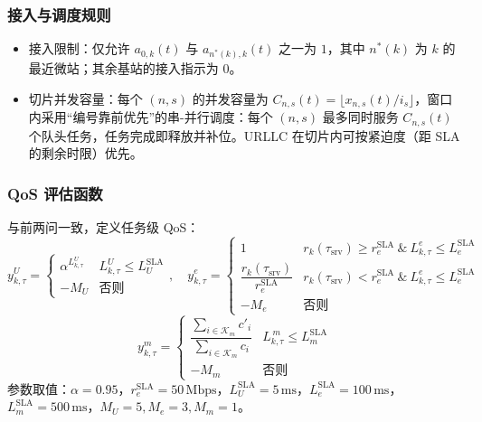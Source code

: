 \subsubsection{接入与调度规则}

\begin{itemize}
  \item 接入限制：仅允许 $a_{0,k}(t)$ 与 $a_{n^*(k),k}(t)$ 之一为 $1$，其中 $n^*(k)$ 为 $k$ 的最近微站；其余基站的接入指示为 $0$。
  \item 切片并发容量：每个 $(n,s)$ 的并发容量为 $C_{n,s}(t)=\big\lfloor x_{n,s}(t)/i_s\big\rfloor$，窗口内采用“编号靠前优先”的串-并行调度：每个 $(n,s)$ 最多同时服务 $C_{n,s}(t)$ 个队头任务，任务完成即释放并补位。URLLC 在切片内可按紧迫度（距 SLA 的剩余时限）优先。
\end{itemize}

\subsubsection{QoS 评估函数}

与前两问一致，定义任务级 QoS：
\begin{equation}
 y^{U}_{k,\tau}=\begin{cases}
 \alpha^{L^{U}_{k,\tau}} & L^{U}_{k,\tau}\le L^{\text{SLA}}_{U}\\
 -M_U & \text{否则}
 \end{cases},\quad
 y^{e}_{k,\tau}=\begin{cases}
 1 & r_{k}(\tau_\text{srv})\ge r^{\text{SLA}}_{e}\ \&\ L^{e}_{k,\tau}\le L^{\text{SLA}}_{e}\\
 \dfrac{r_{k}(\tau_\text{srv})}{r^{\text{SLA}}_{e}} & r_{k}(\tau_\text{srv})< r^{\text{SLA}}_{e}\ \&\ L^{e}_{k,\tau}\le L^{\text{SLA}}_{e}\\
 -M_e & \text{否则}
 \end{cases}
\end{equation}
\begin{equation}
 y^{m}_{k,\tau}=\begin{cases}
 \dfrac{\sum\limits_{i\in\mathcal{K}_m}c'_i}{\sum\limits_{i\in\mathcal{K}_m}c_i} & L^{\,m}_{k,\tau}\le L^{\text{SLA}}_{m}\\
 -M_m & \text{否则}
 \end{cases}
\end{equation}
参数取值：$\alpha=0.95$，$r^{\text{SLA}}_e=50\,\mathrm{Mbps}$，$L^{\text{SLA}}_{U}=5\,\mathrm{ms}$，$L^{\text{SLA}}_{e}=100\,\mathrm{ms}$，$L^{\text{SLA}}_{m}=500\,\mathrm{ms}$，$M_U=5, M_e=3, M_m=1$。

